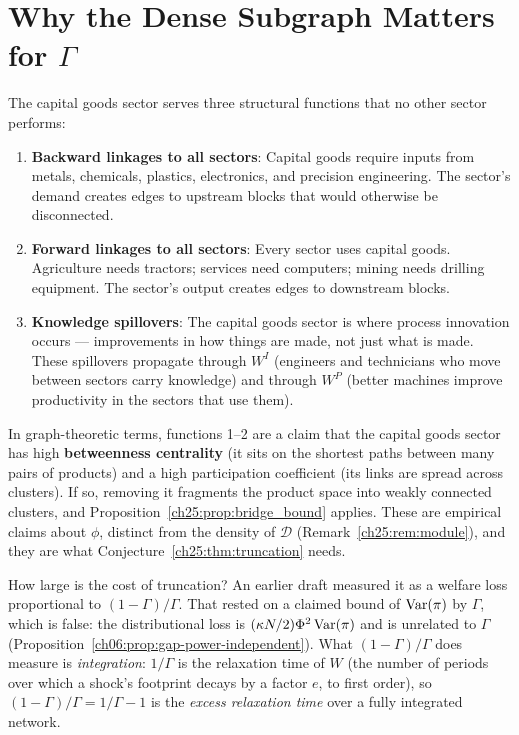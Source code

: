 \documentclass[../structural_economics_book.tex]{subfiles}
\begin{document}
\section{Why the Dense Subgraph Matters for $\Gamma$}
\label{ch25:sec:why}

\begin{remark}\label{ch25:prop:bridge}
The capital goods sector serves three structural functions that no other sector performs:
\begin{enumerate}
\item \textbf{Backward linkages to all sectors}: Capital goods require inputs from metals, chemicals, plastics, electronics, and precision engineering. The sector's demand creates edges to upstream blocks that would otherwise be disconnected.

\item \textbf{Forward linkages to all sectors}: Every sector uses capital goods. Agriculture needs tractors; services need computers; mining needs drilling equipment. The sector's output creates edges to downstream blocks.

\item \textbf{Knowledge spillovers}: The capital goods sector is where process innovation occurs --- improvements in how things are made, not just what is made. These spillovers propagate through $W^I$ (engineers and technicians who move between sectors carry knowledge) and through $W^P$ (better machines improve productivity in the sectors that use them).
\end{enumerate}

In graph-theoretic terms, functions 1--2 are a claim that the capital goods sector has high \textbf{betweenness centrality} (it sits on the shortest paths between many pairs of products) and a high participation coefficient (its links are spread across clusters). If so, removing it fragments the product space into weakly connected clusters, and Proposition~\ref{ch25:prop:bridge_bound} applies. These are empirical claims about $\phi$, distinct from the density of $\mathcal{D}$ (Remark~\ref{ch25:rem:module}), and they are what Conjecture~\ref{ch25:thm:truncation} needs.
\end{remark}

How large is the cost of truncation? An earlier draft measured it as a welfare loss proportional to $(1-\Gamma)/\Gamma$. That rested on a claimed bound of $\operatorname{Var}(\pi)$ by $\Gamma$, which is false: the distributional loss is $(\kappa N/2)\Phi^2\operatorname{Var}(\pi)$ and is unrelated to $\Gamma$ (Proposition~\ref{ch06:prop:gap-power-independent}). What $(1-\Gamma)/\Gamma$ does measure is \emph{integration}: $1/\Gamma$ is the relaxation time of $W$ (the number of periods over which a shock's footprint decays by a factor $e$, to first order), so $(1-\Gamma)/\Gamma = 1/\Gamma - 1$ is the \emph{excess relaxation time} over a fully integrated network.
\end{document}
